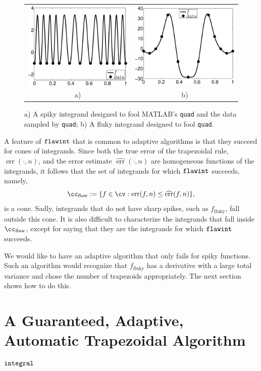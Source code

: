 \documentclass[]{article}
\DeclareMathOperator{\integ}{\texttt{\textup{integral}}}
\DeclareMathOperator{\flawinteg}{\texttt{\textup{flawint}}}
\DeclareMathOperator{\err}{err}
\newcommand{\herr}{\widehat{\err}}
\theoremstyle{definition}
\theoremstyle{remark}
\begin{document}
\begin{figure}
\centering 
\begin{tabular}{cc}
\includegraphics[width=5.5cm]{ExpositoryPaperSpikyquad.eps}
&
\includegraphics[width=5.5cm]{ExpositoryPaperFlukyquad.eps} \\
a) & b)
\end{tabular}
\caption{a) A spiky integrand designed to fool MATLAB's {\tt quad} and the data sampled by {\tt quad}; b) A fluky integrand designed to fool {\tt quad}. \label{fig:foolquad}}
\end{figure}

A feature of $\flawinteg$ that is common to adaptive algorithms is that they succeed for cones of integrands.  Since both the true error of the trapezoidal rule, $\err(\cdot,n)$, and the error estimate $\herr(\cdot,n)$ are homogeneous functions of the integrands, it follows that the set of integrands for which $\flawinteg$ succeeds, namely, 
\[
\cc_{\text{flaw}} := \{ f \in \cv : \err(f,n) \le \herr(f,n) \},
\] 
is a cone. Sadly, integrands that do not have sharp spikes, such as $f_{\text{fluky}}$, fall outside this cone.  It is also difficult to characterize the integrands that fall inside $\cc_{\text{flaw}}$, except for saying that they are the integrands for which $\flawinteg$ succeeds.

We would like to have an adaptive algorithm that only fails for spiky functions.  Such an algorithm would recognize that $f_{\text{fluky}}$ has a derivative with a large total variance and chose the number of trapezoids appropriately.  The next section shows how to do this.

\section{A Guaranteed, Adaptive, Automatic Trapezoidal Algorithm $\integ$} \label{newalgosec}
\end{document}
